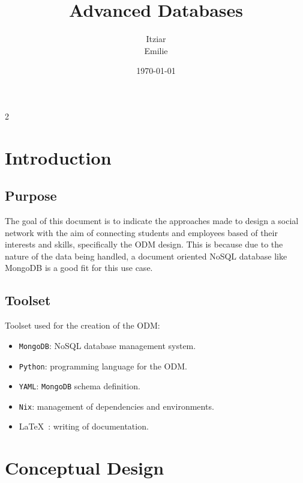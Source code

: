 \documentclass[english]{article}
\title{Advanced Databases}
\author{Itziar \\ Emilie}
\date{\today}
\begin{document}
\maketitle

\begin{multicols}{2}
	\tableofcontents
\end{multicols}



\section{Introduction}

\subsection{Purpose}

\par
The goal of this document is to indicate the approaches made to design a
social network with the aim of connecting students and employees based of
their interests and skills, specifically the ODM design. This is because
due to the nature of the data being handled, a document oriented NoSQL
database like MongoDB is a good fit for this use case.

\subsection{Toolset}

\par
Toolset used for the creation of the ODM:

\begin{itemize}
	\item \texttt{MongoDB}: NoSQL database management system.
	\item \texttt{Python}: programming language for the ODM.
	\item \texttt{YAML}: \texttt{MongoDB} schema definition.
	\item \texttt{Nix}: management of dependencies and environments.
	\item \LaTeX\ : writing of documentation.
\end{itemize}



\section{Conceptual Design}
\end{document}
